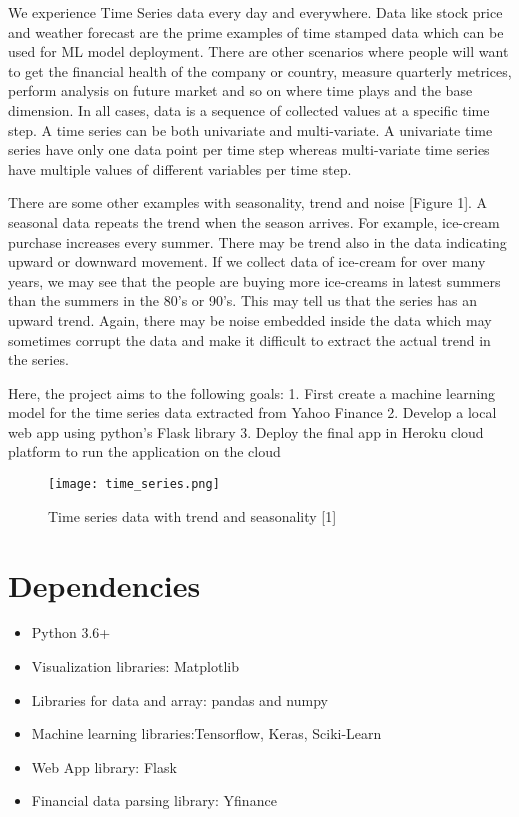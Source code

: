 \documentclass[11pt]{diazessay} %
\begin{document}
We experience Time Series data every day and everywhere. Data like stock price and weather forecast are the prime examples of time stamped data which can be used for ML model deployment. There are other scenarios where people will want to get the financial health of the company or country, measure quarterly metrices, perform analysis on future market and so on where time plays and the base dimension. In all cases, data is a sequence of collected values at a specific time step. A time series can be both univariate and multi-variate. A univariate time series have only one data point per time step whereas multi-variate time series have multiple values of different variables per time step.

There are some other examples with seasonality, trend and noise [Figure 1]. A seasonal data repeats the trend when the season arrives. For example, ice-cream purchase increases every summer. There may be trend also in the data indicating upward or downward movement. If we collect data of ice-cream for over many years, we may see that the people are buying more ice-creams in latest summers than the summers in the 80’s or 90’s. This may tell us that the series has an upward trend. Again, there may be noise embedded inside the data which may sometimes corrupt the data and make it difficult to extract the actual trend in the series.
 

Here, the project aims to the following goals:
1.	First create a machine learning model for the time series data extracted from Yahoo Finance
2.	Develop a local web app using python's Flask library
3.	Deploy the final app in Heroku cloud platform to run the application on the cloud


\begin{figure}[!h]
\begin{center}
\texttt{[image: time\_series.png]} %
\caption{Time series data with trend and seasonality [1]}
\end{center}
\end{figure}


\section{Dependencies}
\begin{itemize}
	\item Python 3.6+
	\item Visualization libraries: Matplotlib
	\item Libraries for data and array: pandas and numpy
	\item Machine learning libraries:Tensorflow, Keras, Sciki-Learn
	\item Web App library: Flask
	\item Financial data parsing library: Yfinance
\end{itemize}
\end{document}
